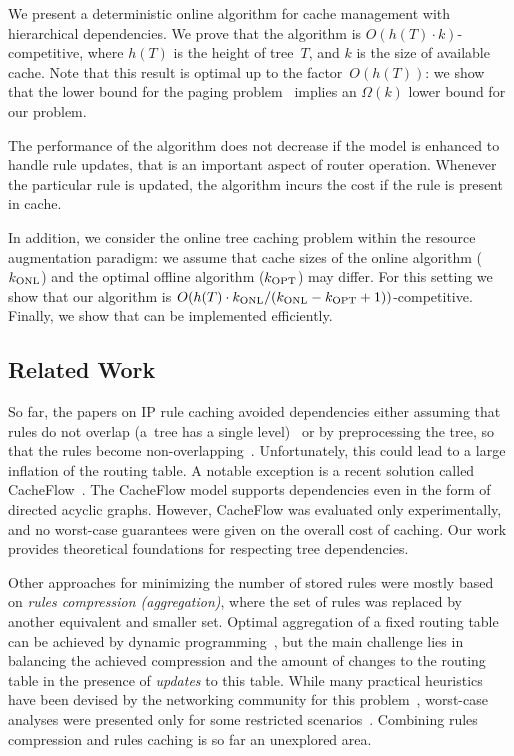 We present a deterministic online algorithm for cache management with hierarchical dependencies.
We prove that the algorithm is
$O(h(T)\cdot k)$-competitive, where $h(T)$ is the height of tree~$T$, and $k$ is the size of available cache.
Note that this
result is optimal up to the factor~$O(h(T))$: we show that the lower
bound for the paging problem~\cite{competitive-analysis} implies an
$\Omega(k)$ lower bound for our problem.

The performance of the algorithm does not decrease if the model is enhanced to handle rule updates, that is an important aspect of router operation.
Whenever the particular rule is updated, the algorithm incurs the cost if the rule is present in cache.

In addition, we consider the online tree caching problem within the resource
augmentation paradigm: we assume that cache sizes of the online algorithm
($k_\textnormal{ONL}$)  and the optimal offline algorithm ($k_\textnormal{OPT}$) may differ.
For this setting we show that our algorithm is
$O(h(T) \cdot k_\textnormal{ONL}/(k_\textnormal{ONL}-k_\textnormal{OPT}+1))$-competitive.
Finally, we show that \ALG can be
implemented efficiently.

\subsection{Related Work}

So far, the papers on IP rule caching avoided dependencies either assuming
that rules do not overlap (a~tree has a single level)~\cite{route-caching-flat} 
or by preprocessing the tree, so that the rules become
non-overlapping~\cite{prefix-caching,fib-caching-non-overlapping}.
Unfortunately, this could lead to a large inflation of the routing table. A
notable exception is a recent solution called CacheFlow~\cite{cacheflow}. The
CacheFlow model supports dependencies even in the form of directed acyclic
graphs. However, CacheFlow was evaluated only experimentally, and no
worst-case guarantees were given on the overall cost of caching. Our work
provides theoretical foundations for respecting tree dependencies.


Other approaches for minimizing the number of stored rules were mostly based
on \emph{rules compression (aggregation)}, where the set of rules was replaced
by another equivalent and smaller set. Optimal aggregation of a fixed routing
table can be achieved by dynamic
programming~\cite{ortc,fib-compression-two-dimensional}, but the main
challenge lies in balancing the achieved compression and the amount of changes
to the routing table in the presence of \emph{updates} to this table. While
many practical heuristics have been devised by the networking community for
this problem~\cite{mms,fib-compression-fifa,fib-compression-globecom10,fib-compression-infocom13,fib-sigcomm,fib-compression-smalta,fib-compression-infocom10},
worst-case analyses were presented only for some restricted
scenarios~\cite{fib-icdcs,fib-sirocco}. Combining rules compression and rules
caching is so far an unexplored area.



